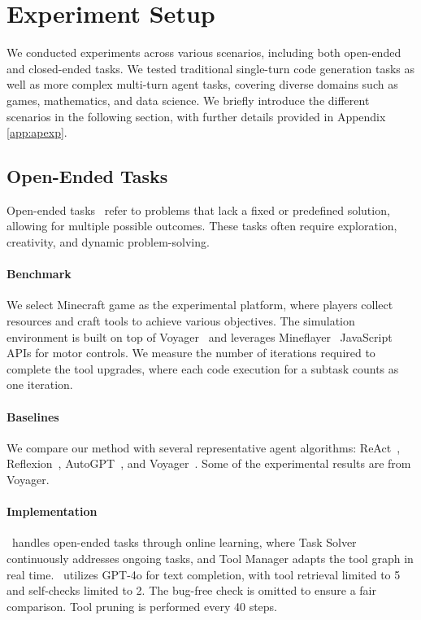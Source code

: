 
\vspace{-2pt}
\section{Experiment Setup}
\label{sec:exp}
We conducted experiments across various scenarios, including both open-ended and closed-ended tasks. We tested traditional single-turn code generation tasks as well as more complex multi-turn agent tasks, covering diverse domains such as games, mathematics, and data science. We briefly introduce the different scenarios in the following section, with further details provided in Appendix \ref{app:apexp}.
\vspace{-5pt}
\subsection{Open-Ended Tasks}
Open-ended tasks~\citep{wang2023voyager} refer to problems that lack a fixed or predefined solution, allowing for multiple possible outcomes. These tasks often require exploration, creativity, and dynamic problem-solving. 
\vspace{-2pt}
\paragraph{Benchmark}
We select Minecraft game as the experimental platform, where players collect resources and craft tools to achieve various objectives. The simulation environment is built on top of Voyager~\citep{wang2023voyager} and leverages Mineflayer~\citep{mineflayer} JavaScript APIs for motor controls. We measure the number of iterations required to complete the tool upgrades, where each code execution for a subtask counts as one iteration.
\vspace{-2pt}
\paragraph{Baselines}
We compare our method with several representative agent algorithms: ReAct~\citep{yao2022react}, Reflexion~\citep{shinn2023reflexion}, AutoGPT~\citep{richardssignificant}, and Voyager~\citep{wang2023voyager}. Some of the experimental results are from Voyager.
\vspace{-5pt}
\paragraph{Implementation}
\ours\ handles open-ended tasks through online learning, where Task Solver continuously addresses ongoing tasks, and Tool Manager adapts the tool graph in real time. \ours\ utilizes GPT-4o for text completion, with tool retrieval limited to 5 and self-checks limited to 2. The bug-free check is omitted to ensure a fair comparison. Tool pruning is performed every 40 steps.

